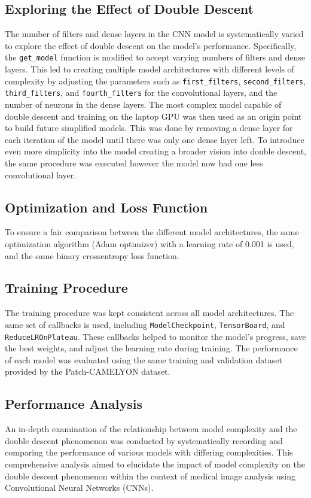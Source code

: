 \subsection{Exploring the Effect of Double Descent}
The number of filters and dense layers in the CNN model is systematically varied to explore the effect of double descent on the model's performance. Specifically, the \texttt{get\_model} function is modified to accept varying numbers of filters and dense layers. This led to creating multiple model architectures with different levels of complexity by adjusting the parameters such as \texttt{first\_filters}, \texttt{second\_filters}, \texttt{third\_filters}, and \texttt{fourth\_filters} for the convolutional layers, and the number of neurons in the dense layers. The most complex model capable of double descent and training on the laptop GPU was then used as an origin point to build future simplified models. This was done by removing a dense layer for each iteration of the model until there was only one dense layer left. To introduce even more simplicity into the model creating a broader vision into double descent, the same procedure was executed however the model now had one less convolutional layer.

\subsection{Optimization and Loss Function}
To ensure a fair comparison between the different model architectures, the same optimization algorithm (Adam optimizer) with a learning rate of 0.001 is used, and the same binary crossentropy loss function.

\subsection{Training Procedure}
The training procedure was kept consistent across all model architectures. The same set of callbacks is used, including \texttt{ModelCheckpoint}, \texttt{TensorBoard}, and \texttt{ReduceLROnPlateau}. These callbacks helped to monitor the model's progress, save the best weights, and adjust the learning rate during training. The performance of each model was evaluated using the same training and validation dataset provided by the Patch-CAMELYON dataset.

\subsection{Performance Analysis}
An in-depth examination of the relationship between model complexity and the double descent phenomenon was conducted by systematically recording and comparing the performance of various models with differing complexities. This comprehensive analysis aimed to elucidate the impact of model complexity on the double descent phenomenon within the context of medical image analysis using Convolutional Neural Networks (CNNs).

